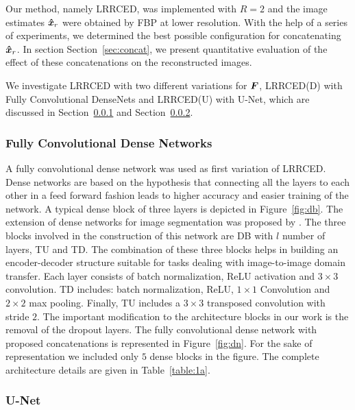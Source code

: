 Our method, namely \ac{LRRCED}, was implemented with $R=2$ and the image estimates $\bm{\hat{x}}_r$ were obtained by \ac{FBP} at lower resolution. With the help of a series of experiments, we determined the best possible configuration for concatenating $\bm{\hat{x}}_r$. In section Section~\ref{sec:concat}, we present quantitative evaluation of the effect of these concatenations on the reconstructed images. 

We investigate \ac{LRRCED} with two different variations for $\bm{F}$, \ac{LRRCED}(D) with Fully Convolutional DenseNets and \ac{LRRCED}(U) with U-Net, which are discussed in Section~\ref{sec:FCDN} and Section~\ref{sec:UNet}. 




\subsubsection{Fully Convolutional Dense Networks}\label{sec:FCDN}

A fully convolutional dense network was used as first variation of \ac{LRRCED}. Dense networks \cite{huang2017densely} are based on the hypothesis that connecting all the layers to each other in a feed forward fashion leads to higher accuracy and easier training of the network. A typical dense block of three layers is depicted in Figure~\ref{fig:db}. The extension of dense networks for image segmentation was proposed by \cite{jegou2017one}. The three  blocks involved in the construction of this network are \ac{DB} with $l$ number of layers, \ac{TU} and \ac{TD}. The combination of these three blocks helps in building an encoder-decoder structure suitable for tasks dealing with image-to-image domain transfer. Each layer consists of batch normalization, \ac{ReLU} activation and $3\times 3$ convolution. \ac{TD} includes: batch normalization, \ac{ReLU}, $1\times 1$ Convolution and $2\times 2$ max pooling. Finally, \ac{TU}  includes a $3\times 3$ transposed convolution with stride $2$. The important modification to the architecture blocks in our work is the removal of the dropout layers. The fully convolutional dense network with proposed concatenations is represented in Figure~\ref{fig:dn}. For the sake of representation we included only $5$ dense blocks in the figure. The complete architecture details are given in Table~\ref{table:1a}. 


\subsubsection{U-Net}\label{sec:UNet}

